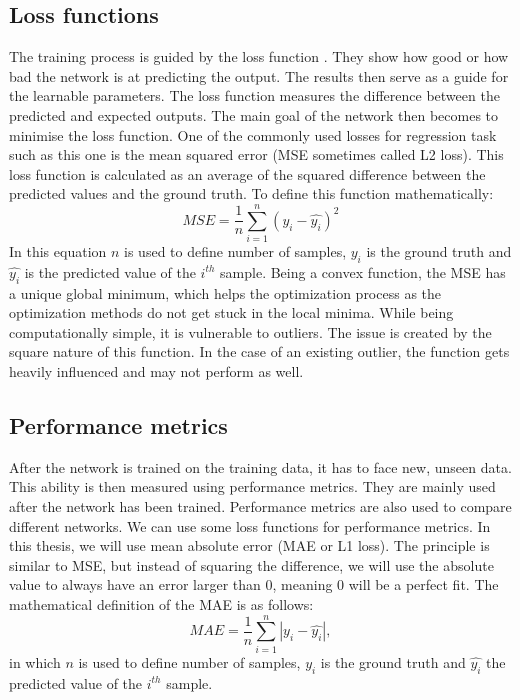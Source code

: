 \subsection{Loss functions}
The training process is guided by the loss function \cite{loss}. They show how good or how bad the network is at predicting the output. The results then serve as a guide for the learnable parameters. The loss function measures the difference between the predicted and expected outputs. The main goal of the network then becomes to minimise the loss function. One of the commonly used losses for regression task such as this one is the mean squared error (MSE sometimes called L2 loss). This loss function is calculated as an average of the squared difference between the predicted values and the ground truth. To define this function mathematically:
\begin{equation}
	MSE = \frac{1}{n}\sum_{i=1}^{n}(y_i -  \hat{y_i})^2
\end{equation}
In this equation $n$ is used to define number of samples, $y_i$ is the ground truth and $\hat{y_i}$ is the predicted value of the $i^{th}$ sample. Being a convex function, the MSE has a unique global minimum, which helps the optimization process as the optimization methods do not get stuck in the local minima. While being computationally simple, it is vulnerable to outliers. The issue is created by the square nature of this function. In the case of an existing outlier, the function gets heavily influenced and may not perform as well.
\\
\subsection{Performance metrics}
After the network is trained on the training data, it has to face new, unseen data. This ability is then measured using performance metrics. They are mainly used after the network has been trained. Performance metrics are also used to compare different networks. We can use some loss functions for performance metrics. In this thesis, we will use mean absolute error (MAE or L1 loss). The principle is similar to MSE, but instead of squaring the difference, we will use the absolute value to always have an error larger than 0, meaning 0 will be a perfect fit. The mathematical definition of the MAE is as follows:
\begin{equation}
	MAE = \frac{1}{n}\sum_{i=1}^{n}|y_i -  \hat{y_i}|,
\end{equation}
in which $n$ is used to define number of samples, $y_i$ is the ground truth and $\hat{y_i}$ the predicted value of the $i^{th}$ sample.

